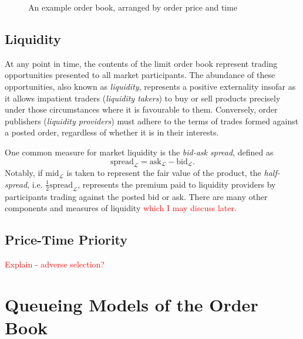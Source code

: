 \documentclass[honours,12pt]{unswthesis}
\numberwithin{equation}{section}
\begin{document}
\begin{figure}[h]
\caption{An example order book, arranged by order price and time}
\end{figure}

\subsection{Liquidity}
At any point in time, the contents of the limit order book represent trading opportunities presented to all market participants. The abundance of these opportunities, also known as \textit{liquidity}, represents a positive externality insofar as it allows impatient traders (\textit{liquidity takers}) to buy or sell products precisely under those circumstances where it is favourable to them. Conversely, order publishers (\textit{liquidity providers}) must adhere to the terms of trades formed against a posted order, regardless of whether it is in their interests.

One common measure for market liquidity is the \textit{bid-ask spread}, defined as
	$$\text{spread}_\mathcal{L} = \text{ask}_\mathcal{L} - \text{bid}_\mathcal{L}.$$
Notably, if $\text{mid}_\mathcal{L}$ is taken to represent the fair value of the product, the \textit{half-spread}, i.e. $\frac{1}{2}\text{spread}_\mathcal{L}$, represents the premium paid to liquidity providers by participants trading against the posted bid or ask. There are many other components and measures of liquidity \textcolor{red}{which I may discuss later}.

\subsection{Price-Time Priority}

\textcolor{red}{Explain - adverse selection?}

\section{Queueing Models of the Order Book}
\end{document}
